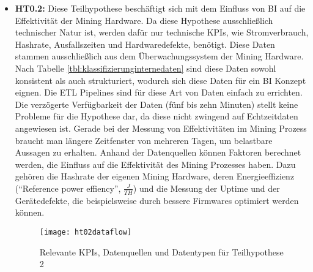\begin{itemize}
    \begin{figure}[H]
        \caption{Relevante KPIs, Datenquellen und Datentypen für Teilhypothese 1}
        \texttt{[image: ht01dataflow]}
        \label{figure:ht01dataflow}
    \end{figure}

    \item \textbf{\ac{HT0.2}: }Diese Teilhypothese beschäftigt sich mit dem Einfluss von \ac{BI} auf die Effektivität der
    Mining Hardware. Da diese Hypothese ausschließlich technischer Natur ist, werden dafür nur technische \acp{KPI}, wie
    Stromverbrauch, Hashrate, Ausfallszeiten und Hardwaredefekte, benötigt. Diese Daten stammen ausschließlich aus dem
    Überwachungssystem der Mining Hardware. Nach Tabelle \ref{tbl:klassifizierunginternedaten} sind diese Daten sowohl
    konsistent als auch strukturiert, wodurch sich diese Daten für ein \ac{BI} Konzept eignen. Die \ac{ETL} Pipelines sind
    für diese Art von Daten einfach zu errichten. Die verzögerte Verfügbarkeit der Daten (fünf bis zehn Minuten) stellt keine
    Probleme für die Hypothese dar, da diese nicht zwingend auf Echtzeitdaten angewiesen ist. Gerade bei der Messung von
    Effektivitäten im Mining Prozess braucht man längere Zeitfenster von mehreren Tagen, um belastbare Aussagen zu erhalten.
    Anhand der Datenquellen können Faktoren berechnet werden, die Einfluss auf die Effektivität des Mining Prozesses haben.
    Dazu gehören die Hashrate der eigenen Mining Hardware, deren Energieeffizienz ("`Reference power effiency"',
    $\frac{J}{TH}$) und die Messung der Uptime und der Gerätedefekte, die beispielsweise durch bessere Firmwares optimiert
    werden können.

    \begin{figure}[H]
        \caption{Relevante KPIs, Datenquellen und Datentypen für Teilhypothese 2}
        \texttt{[image: ht02dataflow]}
        \label{figure:ht02dataflow}
    \end{figure}


\end{itemize}
